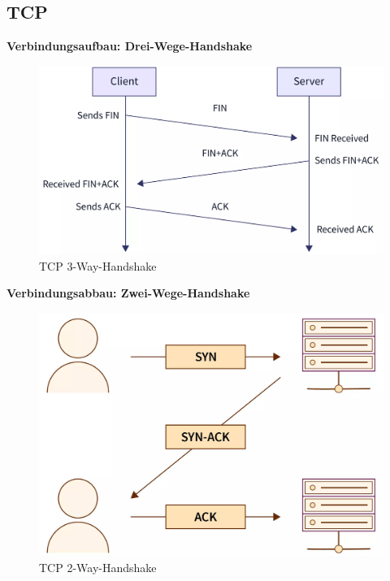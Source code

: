 \subsection*{TCP}
\textbf{Verbindungsaufbau: Drei-Wege-Handshake}
\begin{figure}[H]
	\centering
	\includegraphics[width=0.8\linewidth]{figures/tcp_3wh.png}
	\caption{TCP 3-Way-Handshake}
\end{figure}

\textbf{Verbindungsabbau: Zwei-Wege-Handshake}
\begin{figure}[H]
	\centering
	\includegraphics[width=0.8\linewidth]{figures/tcp_2wh.png}
	\caption{TCP 2-Way-Handshake}
\end{figure}

